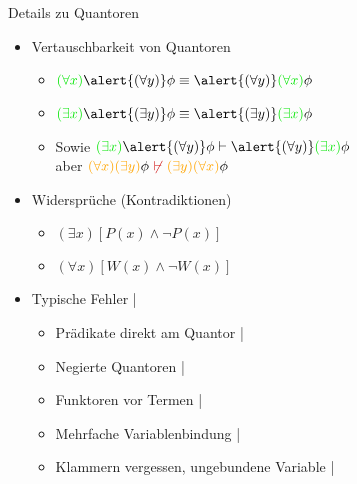 \begin{frame}
  {Details zu Quantoren}
  \label{slide:quantoren}
  \onslide<+->
  \begin{itemize}[<+->]
    \item Vertauschbarkeit von Quantoren
      \begin{itemize}[<+->]
        \item $\gruen{(\forall x)}\alert{(\forall y)}\phi\equiv\alert{(\forall y)}\gruen{(\forall x)}\phi$
          \Viertelzeile
        \item $\gruen{(\exists x)}\alert{(\exists y)}\phi\equiv\alert{(\exists y)}\gruen{(\exists x)}\phi$
          \Viertelzeile
        \item Sowie $\gruen{(\exists x)}\alert{(\forall y)}\phi \vdash\alert{(\forall y)}\gruen{(\exists x)}\phi$\\
          aber $\orongsch{(\forall x)(\exists y)}\phi\ \rot{\not\vdash}\ \orongsch{(\exists y)(\forall x)}\phi$
      \end{itemize}
      \Halbzeile
    \item Widersprüche (Kontradiktionen)
      \begin{itemize}[<+->]
        \item $(\exists x)[P(x)\wedge\neg P(x)]$ 
        \item $(\forall x)[W(x)\wedge \neg W(x)]$ 
      \end{itemize}
      \Halbzeile
    \item Typische Fehler | 
      \begin{itemize}[<+->]
        \item Prädikate direkt am Quantor |  
        \item Negierte Quantoren |  
        \item Funktoren vor Termen |  
        \item Mehrfache Variablenbindung | 
        \item Klammern vergessen, ungebundene Variable |  
      \end{itemize}
  \end{itemize}
\end{frame}

